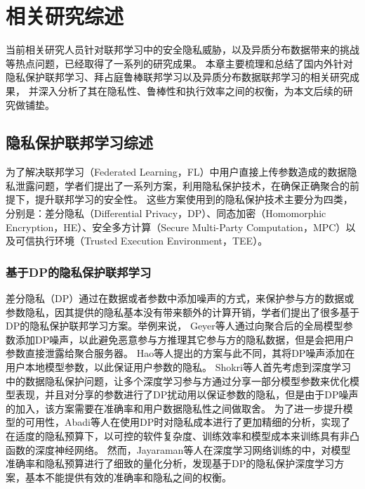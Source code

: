 \chapter{相关研究综述}
\label{chap:main}
当前相关研究人员针对联邦学习中的安全隐私威胁，以及异质分布数据带来的挑战等热点问题，已经取得了一系列的研究成果。
本章主要梳理和总结了国内外针对隐私保护联邦学习、拜占庭鲁棒联邦学习以及异质分布数据联邦学习的相关研究成果，
并深入分析了其在隐私性、鲁棒性和执行效率之间的权衡，为本文后续的研究做铺垫。

\section{隐私保护联邦学习综述}
\label{sec:ppfl}
为了解决联邦学习（Federated Learning，FL）中用户直接上传参数造成的数据隐私泄露问题，学者们提出了一系列方案，利用隐私保护技术，在确保正确聚合的前提下，提升联邦学习的安全性。
这些方案使用到的隐私保护技术主要分为四类，分别是：差分隐私（Differential Privacy，DP）\cite{dwork2006differential}、同态加密（Homomorphic Encryption，HE）\cite{gentry2013homomorphic}、安全多方计算（Secure Multi-Party Computation，MPC）\cite{shamir1979share}以及可信执行环境（Trusted Execution Environment，TEE）\cite{sabt2015trusted}。

\subsection{基于DP的隐私保护联邦学习}
差分隐私（DP）通过在数据或者参数中添加噪声的方式，来保护参与方的数据或参数隐私，因其提供的隐私基本没有带来额外的计算开销，学者们提出了很多基于DP的隐私保护联邦学习方案\cite{agarwal2018cpsgd, choudhury2019differential, dubey2020differentially, geyer2017differentially, hao2019efficient, hao2019towards, hu2020personalized, rodriguez2020federated, triastcyn2019federated, wei2020federated}。举例来说，
Geyer等人\cite{geyer2017differentially}通过向聚合后的全局模型参数添加DP噪声，以此避免恶意参与方推理其它参与方的隐私数据，但是会把用户参数直接泄露给聚合服务器。
Hao等人\cite{hao2019efficient}提出的方案与此不同，其将DP噪声添加在用户本地模型参数，以此保证用户参数的隐私。
Shokri等人\cite{shokri2015privacy}首先考虑到深度学习中的数据隐私保护问题，让多个深度学习参与方通过分享一部分模型参数来优化模型表现，并且对分享的参数进行了DP扰动用以保证参数的隐私，但是由于DP噪声的加入，该方案需要在准确率和用户数据隐私性之间做取舍。
为了进一步提升模型的可用性，Abadi等人\cite{abadi2016deep}在使用DP时对隐私成本进行了更加精细的分析，实现了在适度的隐私预算下，以可控的软件复杂度、训练效率和模型成本来训练具有非凸函数的深度神经网络。
然而，Jayaraman等人\cite{jayaraman2019evaluating}在深度学习网络训练的中，对模型准确率和隐私预算进行了细致的量化分析，发现基于DP的隐私保护深度学习方案，基本不能提供有效的准确率和隐私之间的权衡。

